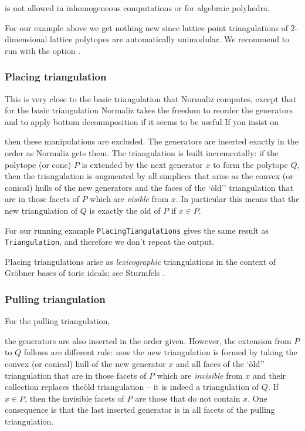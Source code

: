  is not allowed in inhomogeneous computations or for algebraic polyhedra.

For our example above we get nothing new since lattice point triangulations of $2$-dimensional lattice polytopes are automatically unimodular. We recommend to run  with the option .

\subsubsection{Placing triangulation}\label{PlacingTri}

This is very close to the basic triangulation that Normaliz computes, except that for the basic triangulation Normaliz takes the freedom to reorder the generators and to apply bottom decomnposition if it seems to be useful If you insist on
\begin{itemize}
	\itemtt[PlacingTriangulation]
\end{itemize}
then these manipulations are excluded. The generators are inserted exactly in the order as Normaliz gets them. The triangulation is built incrementally: if the polytope (or cone) $P$ is extended by the next generator $x$ to form the polytope $Q$, then the triangulation is augmented by all simplices that arise as the convex (or conical) hulls of the new generators and the faces of the `òld'' triangulation that are in those facets of $P$ which are \emph{visible} from $x$. In particular this means that the new triangulation of $Q$ is exactly the old of $P$ if $x\in P$.

For our running example \verb|PlacingTiangulations| gives the same result as \verb|Triangulation|, and therefore we don't repeat the output.

Placing triangulations arise as \emph{lexicographic} triangulations in the context of Gröbner bases of toric ideals; see Sturmfels \cite[p. 67]{Stu}.

\subsubsection{Pulling triangulation}\label{PullingTri}

For the pulling triangulation,
\begin{itemize}
	\itemtt[PullingTriangulation]
\end{itemize}
the generators are also inserted in the order given. However, the extension from $P$ to $Q$ follows are different rule: now the new triangulation is formed by taking the convex (or conical) hull of the new generator $x$ and all  faces of the `òld'' triangulation that are in those facets of $P$ which are \emph{invisible} from $x$ and their collection replaces theòld triangulation -- it is indeed a triangulation of $Q$. If $x\in P$, then the invisible facets of $P$ are those that do not contain $x$. One consequence is that the last inserted generator is in all facets of the pulling triangulation. 

